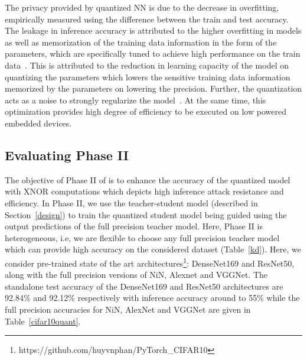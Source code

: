 The privacy provided by quantized NN is due to the decrease in overfitting, empirically measured using the difference between the train and test accuracy.
The leakage in inference accuracy is attributed to the higher overfitting in models as well as memorization of the training data information in the form of the parameters, which are specifically tuned to achieve high performance on the train data~\cite{10.1145/3133956.3134077,236216,DBLP:journals/corr/abs-1812-00910}.
This is attributed to the reduction in learning capacity of the model on quantizing the parameters which lowers the sensitive training data information memorized by the parameters on lowering the precision.
Further, the quantization acts as a noise to strongly regularize the model~\cite{NIPS2016_6573}.
At the same time, this optimization provides high degree of efficiency to be executed on low powered embedded devices.

\subsection{Evaluating Phase II}
\label{evalPh2}

The objective of Phase II of \method\hspace{0.02in} is to enhance the accuracy of the quantized model with XNOR computations which depicts high inference attack resistance and efficiency.
In Phase II, we use the teacher-student model (described in Section~\ref{design}) to train the quantized student model being guided using the output predictions of the full precision teacher model.
Here, Phase II is heterogeneous, i.e, we are flexible to choose any full precision teacher model which can provide high accuracy on the considered dataset (Table~\ref{kd}).
Here, we consider pre-trained state of the art architectures\footnote{https://github.com/huyvnphan/PyTorch\_CIFAR10}: DenseNet169 and ResNet50, along with the full precision versions of NiN, Alexnet and VGGNet.
The standalone test accuracy of the DenseNet169 and ResNet50 architectures are 92.84\% and 92.12\% respectively with inference accuracy around to 55\% while the full precision accuracies for NiN, AlexNet and VGGNet are given in Table~\ref{cifar10quant}.


